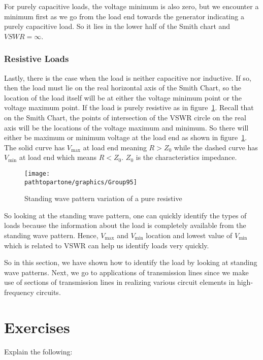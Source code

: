For purely capacitive loads, the voltage minimum is also zero, but we encounter a minimum first as we go from the load end towards the generator indicating a purely capacitive load. So it lies in the lower half of the Smith chart and $VSWR=\infty$.

\subsubsection{Resistive Loads}
Lastly, there is the case when the load is neither capacitive nor inductive. If so, then the load must lie on the real horizontal axis of the Smith Chart, so the location of the load itself will be at either the voltage minimum point or the voltage maximum point. If the load is purely resistive as in figure~\ref{fig:group95}. Recall that on the Smith Chart, the points of intersection of the VSWR circle on the real axis will be the locations of the voltage maximum and minimum. So there will either be maximum or minimum voltage at the load end as shown in figure~\ref{fig:group95}. The solid curve has ${V_\max}$ at load end meaning ${R>Z_0}$ while the dashed curve has ${V_\min}$ at load end which means ${R<Z_0}$. ${Z_0}$ is the characteristics impedance.
\begin{figure}[h]
\centering
\texttt{[image: \\pathtopartone/graphics/Group95]}
\caption{Standing wave pattern variation of a pure resistive}
\label{fig:group95}
\end{figure}

So looking at the standing wave pattern, one can quickly identify the types of loads because the information about the load is completely available from the standing wave pattern. Hence, ${V_\max}$ and ${V_\min}$ location and lowest value of ${V_\min}$ which is related to VSWR can help us identify loads very quickly.

So in this section, we have shown how to identify the load by looking at standing wave patterns. Next, we go to applications of transmission lines since we make use of sections of transmission lines in realizing various circuit elements in high-frequency circuits.

\section*{Exercises}
\begin{ExerciseList}
\Exercise[label={ex91}]
Explain the following:
\end{ExerciseList}